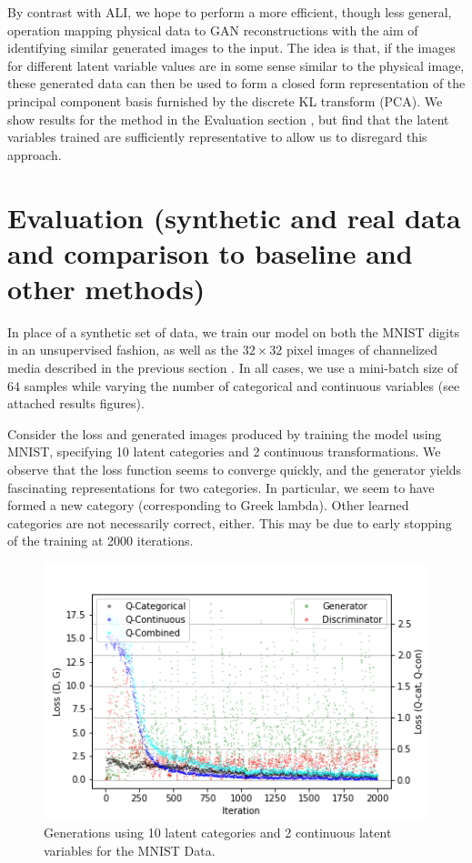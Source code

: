 \documentclass{article}
\begin{document}
By contrast with ALI, we hope to perform a more efficient, though less general, operation mapping physical data to GAN reconstructions with the aim of identifying similar generated images to the input.  The idea is that, if the images for different latent variable values are in some sense similar to the physical image, these generated data can then be used to form a closed form representation of the principal component basis furnished by the discrete KL transform (PCA).  We show results for the method in the Evaluation section \label{evaluation}, but find that the latent variables trained are sufficiently representative to allow us to disregard this approach. 


\section{Evaluation (synthetic and real data and comparison to baseline and other methods)}\label{evaluation}

In place of a synthetic set of data, we train our model on both the MNIST digits in an unsupervised fashion, as well as the $32\times 32$ pixel images of channelized media described in the previous section \label{related}.  In all cases, we use a mini-batch size of $64$ samples while varying the number of categorical and continuous variables (see attached results figures).

Consider the loss \label{MNISTt} and generated images \label{MNISTg} produced by training the model using MNIST, specifying 10 latent categories and 2 continuous transformations.  We observe that the loss function seems to converge quickly, and the generator yields fascinating representations for two categories.  In particular, we seem to have formed a new category (corresponding to Greek lambda).  Other learned categories are not necessarily correct, either.  This may be due to early stopping of the training at 2000 iterations.

\begin{figure}[h]
\centering
  \includegraphics[]{figures/lPlotGDQQData2Axes.png}
  \caption{Generations using 10 latent categories and 2 continuous latent variables for the MNIST Data. }
\end{figure}\label{MNISTt}
\end{document}
